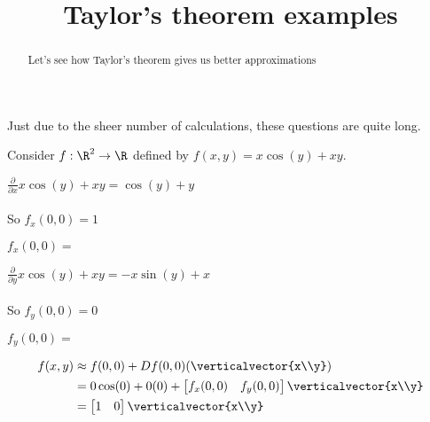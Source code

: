 \documentclass{ximera}
\title{Taylor's theorem examples}
\begin{document}
	\begin{abstract}
		Let's see how Taylor's theorem gives us better approximations
	\end{abstract}\maketitle
	
	\begin{warning}
		Just due to the sheer number of calculations, these questions are quite long.
	\end{warning}
	
	\begin{question}
		Consider $f:\R^2 \to \R$ defined by $f(x,y) = x\cos(y)+xy$.
		\begin{solution}
			\begin{hint}
				\begin{question}
					\begin{solution}
						\begin{hint}
							$\frac{\partial}{\partial x} x\cos(y)+xy= \cos(y)+y$
							\\
							\\
							So $f_x(0,0) = 1$
						\end{hint}
					$f_x(0,0) = $
					\end{solution}
					\begin{solution}
						\begin{hint}
							$\frac{\partial }{\partial y} x\cos(y)+xy = -x\sin(y)+x$
							\\
							\\
							So $f_y(0,0) = 0$
						\end{hint}
					$f_y(0,0) = $\answer{0}
					\end{solution}
				\end{question}
			\end{hint}
			\begin{hint}
				\begin{align*}
					f(x,y) &\approx f(0,0)+ Df(0,0)(\verticalvector{x\\y})\\
						&=0\cos(0)+0(0)+\begin{bmatrix} f_x(0,0)  & f_y(0,0) \end{bmatrix}\verticalvector{x\\y}\\
						&= \begin{bmatrix} 1 & 0 \end{bmatrix}\verticalvector{x\\y}\\

\end{align*}
\end{hint}
\end{solution}
\end{question}
\end{document}
